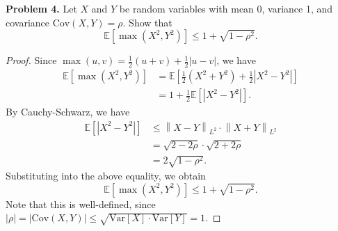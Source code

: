 \documentclass[11pt,letterpaper]{report}
\newcommand{\Lp}[2]{\left\|{#1}\right\|_{L^{#2}}}
\newcommand{\E}{\mathbb{E}}
\newcommand{\Var}{\text{Var}}
\newcommand{\Cov}{\text{Cov}}
\begin{document}
\noindent\textbf{Problem 4. }
Let $X$ and $Y$ be random variables with mean 0, variance 1, and covariance $\Cov(X,Y) = \rho$. Show that
\[
\E[\max(X^2, Y^2)]\leq 1+\sqrt{1-\rho^2}.
\]
\begin{proof}
	Since $\max(u, v) = \frac{1}{2}(u+v) + \frac{1}{2}|u-v|$, we have
	\begin{align*}
		\E[\max(X^2, Y^2)] &= \E\left[\frac{1}{2}(X^2+Y^2) + \frac{1}{2}|X^2-Y^2|\right]\\
		&= 1 + \frac{1}{2}\E[|X^2-Y^2|].
	\end{align*}
	By Cauchy-Schwarz, we have
	\begin{align*}
		\E[|X^2-Y^2|] &\leq \Lp{X-Y}{2}\cdot \Lp{X+Y}{2}\\
		&= \sqrt{2-2\rho}\cdot \sqrt{2+2\rho}\\
		&= 2\sqrt{1-\rho^2}.
	\end{align*}
	Substituting into the above equality, we obtain
	\[
	\E[\max(X^2, Y^2)]\leq 1+\sqrt{1-\rho^2}.
	\]
	Note that this is well-defined, since $|\rho| = |\Cov(X,Y)|\leq \sqrt{\Var[X]\cdot \Var[Y]} = 1$.
\end{proof}
\end{document}
